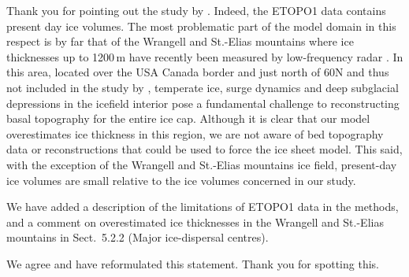 Thank you for pointing out the study by \citet{Clarke.etal.2013}.
Indeed, the ETOPO1 data contains present day ice volumes. The most problematic
part of the model domain in this respect is by far that of the Wrangell and
St.-Elias mountains where ice thicknesses up to 1200\,m have recently been
measured by low-frequency radar \citep{Rignot.etal.2013}. In this area, located
over the USA Canada border and just north of 60{\degree}N and thus not included
in the study by \citet{Clarke.etal.2013}, temperate ice, surge dynamics
and deep subglacial depressions in the icefield interior pose a fundamental
challenge to reconstructing basal topography for the entire ice cap. Although
it is clear that our model overestimates ice thickness in this region, we are
not aware of bed topography data or reconstructions that could be used to force
the ice sheet model. This said, with the exception of the Wrangell and
St.-Elias mountains ice field, present-day ice volumes are small relative to
the ice volumes concerned in our study.

We have added a description of the limitations of ETOPO1 data in the methods,
and a comment on overestimated ice thicknesses in the Wrangell and St.-Elias
mountains in Sect.~5.2.2 (Major ice-dispersal centres).


We agree and have reformulated this statement. Thank you for spotting this.

